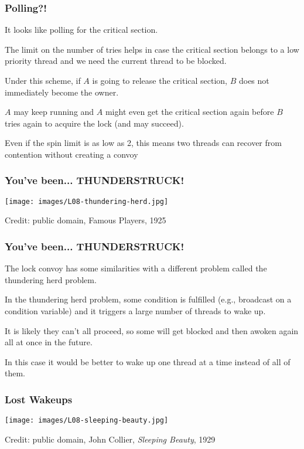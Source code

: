 \begin{frame}
\frametitle{Polling?!}

It looks like polling for the critical section. 

The limit on the number of tries helps in case the critical section belongs to a low priority thread and we need the current thread to be blocked.

Under this scheme, if $A$ is going to release the critical section, $B$ does not immediately become the owner. 

$A$ may keep running and $A$ might even get the critical section again before $B$ tries again to acquire the lock (and may succeed). 

Even if the spin limit is as low as 2, this means two threads can recover from contention without creating a convoy

\end{frame}


\begin{frame}
\frametitle{You've been... THUNDERSTRUCK!}

\begin{center}
\texttt{[image: images/L08-thundering-herd.jpg]}

Credit: public domain, Famous Players, 1925
\end{center}

\end{frame}


\begin{frame}
\frametitle{You've been... THUNDERSTRUCK!}

The lock convoy has some similarities with a different problem called the \alert{thundering herd problem}. 

In the thundering herd problem, some condition is fulfilled (e.g., broadcast on a condition variable) and it triggers a large number of threads to wake up. 

It is likely they can't all proceed, so some will get blocked and then awoken again all at once in the future. 

In this case it would be better to wake up one thread at a time instead of all of them.

\end{frame}

\begin{frame}
\frametitle{Lost Wakeups}

\begin{center}
\texttt{[image: images/L08-sleeping-beauty.jpg]}

Credit: public domain, John Collier, \emph{Sleeping Beauty}, 1929
\end{center}
\end{frame}


